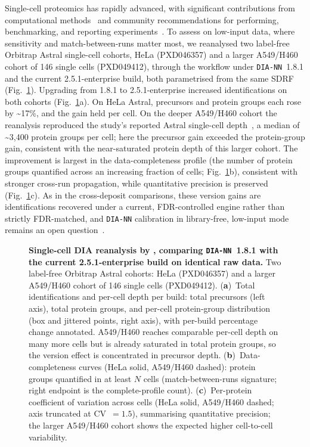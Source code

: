 \documentclass[preprint,12pt]{elsarticle}
\begin{document}
Single-cell proteomics has rapidly advanced, with significant contributions from computational methods~\cite{slavov2025Review} and community recommendations for performing, benchmarking, and reporting experiments~\cite{White_Paper}. To assess \quantmsdiann{} on low-input data, where sensitivity and match-between-runs matter most, we reanalysed two label-free Orbitrap Astral single-cell cohorts, HeLa (PXD046357) and a larger A549/H460 cohort of 146 single cells (PXD049412), through the workflow under \texttt{DIA-NN}~1.8.1 and the current 2.5.1-enterprise build, both parametrised from the same SDRF (Fig.~\ref{fig:single-cell}).
Upgrading from 1.8.1 to 2.5.1-enterprise increased identifications on both cohorts (Fig.~\ref{fig:single-cell}a). On HeLa Astral, precursors and protein groups each rose by \textasciitilde 17\%, and the gain held per cell. On the deeper A549/H460 cohort the reanalysis reproduced the study's reported Astral single-cell depth~\cite{bubis2025astral}, a median of \textasciitilde 3{,}400 protein groups per cell; here the precursor gain exceeded the protein-group gain, consistent with the near-saturated protein depth of this larger cohort.
The improvement is largest in the data-completeness profile (the number of protein groups quantified across an increasing fraction of cells; Fig.~\ref{fig:single-cell}b), consistent with stronger cross-run propagation, while quantitative precision is preserved (Fig.~\ref{fig:single-cell}c). As in the cross-deposit comparisons, these version gains are identifications recovered under a current, FDR-controlled engine rather than strictly FDR-matched, and \texttt{DIA-NN} calibration in library-free, low-input mode remains an open question~\cite{wen2025fdr,krull2024singlecell}.

\begin{figure}[htbp]
  \centering
  \caption[Single-cell DIA reanalysis]{%
    \textbf{Single-cell DIA reanalysis by \quantmsdiann{}, comparing
    \texttt{DIA-NN}~1.8.1 with the current 2.5.1-enterprise build on identical
    raw data.} Two label-free Orbitrap Astral cohorts: HeLa (PXD046357) and a
    larger A549/H460 cohort of 146 single cells (PXD049412).
    (\textbf{a})~Total identifications and per-cell depth per build: total
    precursors (left axis), total protein groups, and per-cell protein-group
    distribution (box and jittered points, right axis), with per-build percentage
    change annotated. A549/H460 reaches comparable per-cell depth on many more
    cells but is already saturated in total protein groups, so the version effect
    is concentrated in precursor depth.
    (\textbf{b})~Data-completeness curves (HeLa solid, A549/H460 dashed): protein
    groups quantified in at least $N$ cells (match-between-runs signature; right
    endpoint is the complete-profile count).
    (\textbf{c})~Per-protein coefficient of variation across cells (HeLa solid,
    A549/H460 dashed; axis truncated at CV~$=1.5$), summarising quantitative
    precision; the larger A549/H460 cohort shows the expected higher
    cell-to-cell variability.
  }
  \label{fig:single-cell}
\end{figure}
\end{document}
